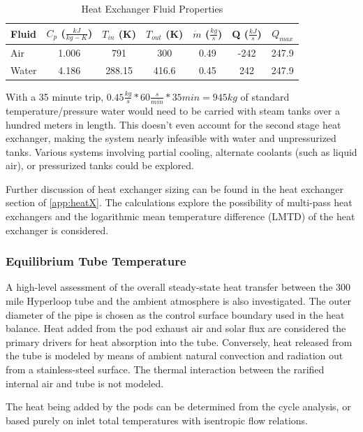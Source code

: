 \documentclass[heading.tex]{subfiles}
\begin{document}

\begin{table}
    \centering
    \caption{Heat Exchanger Fluid Properties}
    \label{tab:HeatEx}
    \begin{tabular}{l  c  c  c  c  c  c} 
        \hline
        Fluid & $C_{p}$ ($\frac{kJ}{kg-K}$)& $T_{in}$ (K) & $T_{out}$ (K) & $\dot{m}$ ($\frac{kg}{s}$) & Q ($\frac{kJ}{s}$) & $Q_{max}$\\ \hline 
        Air & 1.006 & 791 & 300 & 0.49 & -242 & 247.9\\ 
        Water & 4.186 & 288.15 & 416.6 &0.45 & 242 & 247.9\\ \hline
    \end{tabular}
\end{table}

With a 35 minute trip, $0.45 \frac{kg}{s} * 60 \frac{s}{min} * 35min = 945 kg$ of standard temperature/pressure water would need to be carried 
with steam tanks over a hundred meters in length. This doesn't even account for the second stage heat exchanger, making the system nearly infeasible
with water and unpressurized tanks. Various systems involving partial cooling, alternate coolants (such as liquid air), or pressurized tanks could be explored.

Further discussion of heat exchanger sizing can be found in the heat exchanger section of \cref{app:heatX}.
The calculations explore the possibility of multi-pass heat exchangers
and the logarithmic mean temperature difference (LMTD) of the heat exchanger is considered.
\cite{Cengal}
\cite{Turns}


\subsubsection{Equilibrium Tube Temperature}
A high-level assessment of the overall steady-state heat transfer between the 300 mile Hyperloop tube and the ambient atmosphere is
also investigated. The outer diameter of the pipe is chosen as the control surface boundary used in the heat balance. Heat added from the pod exhaust
air and solar flux are considered the primary drivers for heat absorption into the tube. Conversely, heat released from the tube is modeled by means of
ambient natural convection and radiation out from a stainless-steel surface. The thermal interaction between the rarified internal air and
tube is not modeled.

The heat being added by the pods can be determined from the cycle analysis, or based purely on inlet total temperatures with isentropic
flow relations.
\end{document}
